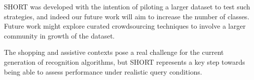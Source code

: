 SHORT was developed with the intention of piloting a larger dataset to test such strategies, and indeed our future work will aim to increase the number of classes. Future work might explore curated crowdsourcing techniques to involve a larger community in growth of the dataset.


The shopping and assistive contexts pose a real challenge for the current generation of recognition algorithms, but SHORT represents a key step towards being able to assess performance under realistic query conditions.




